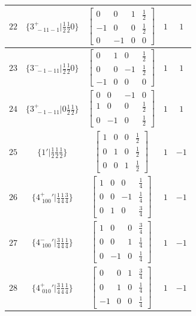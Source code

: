 \documentclass[fleqn,8pt]{jsarticle}
\begin{document}
\begin{longtable}{ccccc}
$ 22 $ & $ \{3^{+}_{\,\,-11-1}|\frac{1}{2} \frac{1}{2} 0\} $ & $ \begin{bmatrix} 0 & 0 & 1 & \frac{1}{2} \\ -1 & 0 & 0 & \frac{1}{2} \\ 0 & -1 & 0 & 0 \end{bmatrix} $ & $ 1 $ & $ 1 $ \\ \hline
$ 23 $ & $ \{3^{-}_{\,\,-1-11}|\frac{1}{2} \frac{1}{2} 0\} $ & $ \begin{bmatrix} 0 & 1 & 0 & \frac{1}{2} \\ 0 & 0 & -1 & \frac{1}{2} \\ -1 & 0 & 0 & 0 \end{bmatrix} $ & $ 1 $ & $ 1 $ \\ \hline
$ 24 $ & $ \{3^{+}_{\,\,-1-11}|0 \frac{1}{2} \frac{1}{2}\} $ & $ \begin{bmatrix} 0 & 0 & -1 & 0 \\ 1 & 0 & 0 & \frac{1}{2} \\ 0 & -1 & 0 & \frac{1}{2} \end{bmatrix} $ & $ 1 $ & $ 1 $ \\ \hline
$ 25 $ & $ \{1{}'|\frac{1}{2} \frac{1}{2} \frac{1}{2}\} $ & $ \begin{bmatrix} 1 & 0 & 0 & \frac{1}{2} \\ 0 & 1 & 0 & \frac{1}{2} \\ 0 & 0 & 1 & \frac{1}{2} \end{bmatrix} $ & $ 1 $ & $ -1 $ \\ \hline
$ 26 $ & $ \{4^{+}_{\,\,100}{}'|\frac{1}{4} \frac{1}{4} \frac{3}{4}\} $ & $ \begin{bmatrix} 1 & 0 & 0 & \frac{1}{4} \\ 0 & 0 & -1 & \frac{1}{4} \\ 0 & 1 & 0 & \frac{3}{4} \end{bmatrix} $ & $ 1 $ & $ -1 $ \\ \hline
$ 27 $ & $ \{4^{-}_{\,\,100}{}'|\frac{3}{4} \frac{1}{4} \frac{1}{4}\} $ & $ \begin{bmatrix} 1 & 0 & 0 & \frac{3}{4} \\ 0 & 0 & 1 & \frac{1}{4} \\ 0 & -1 & 0 & \frac{1}{4} \end{bmatrix} $ & $ 1 $ & $ -1 $ \\ \hline
$ 28 $ & $ \{4^{+}_{\,\,010}{}'|\frac{3}{4} \frac{1}{4} \frac{1}{4}\} $ & $ \begin{bmatrix} 0 & 0 & 1 & \frac{3}{4} \\ 0 & 1 & 0 & \frac{1}{4} \\ -1 & 0 & 0 & \frac{1}{4} \end{bmatrix} $ & $ 1 $ & $ -1 $ \\ \hline

\end{longtable}
\end{document}
